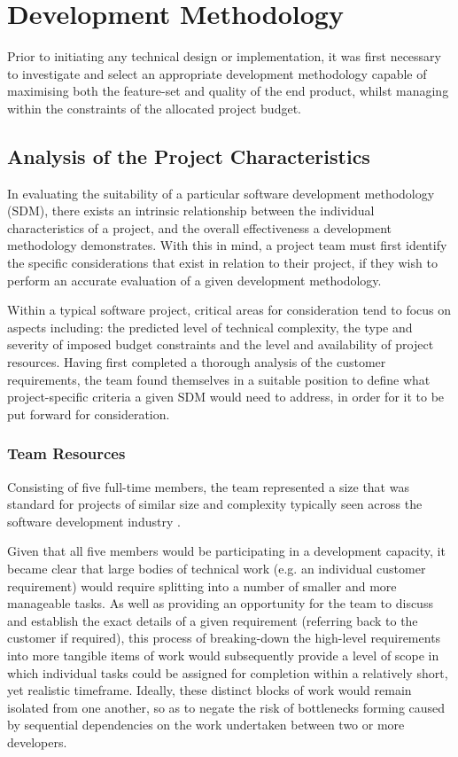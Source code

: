 \chapter{Development Methodology}

Prior to initiating any technical design or implementation, it was first necessary to investigate and select an appropriate development methodology capable of maximising both the feature-set and quality of the end product, whilst managing within the constraints of the allocated project budget.

\section{Analysis of the Project Characteristics}

In evaluating the suitability of a particular software development methodology (SDM), there exists an intrinsic relationship between the individual characteristics of a project, and the overall effectiveness a development methodology demonstrates. With this in mind, a project team must first identify the specific considerations that exist in relation to their project, if they wish to perform an accurate evaluation of a given development methodology.

Within a typical software project, critical areas for consideration tend to focus on aspects including: the predicted level of technical complexity, the type and severity of imposed budget constraints and the level and availability of project resources. Having first completed a thorough analysis of the customer requirements, the team found themselves in a suitable position to define what project-specific criteria a given SDM would need to address, in order for it to be put forward for consideration.

\subsection{Team Resources} 

Consisting of five full-time members, the team represented a size that was standard for projects of similar size and complexity typically seen across the software development industry \cite{scrum}. 

Given that all five members would be participating in a development capacity, it became clear that large bodies of technical work (e.g. an individual customer requirement) would require splitting into a number of smaller and more manageable tasks. As well as providing an opportunity for the team to discuss and establish the exact details of a given requirement (referring back to the customer if required), this process of breaking-down the high-level requirements into more tangible items of work would subsequently provide a level of scope in which individual tasks could be assigned for completion within a relatively short, yet realistic timeframe. Ideally, these distinct blocks of work would remain isolated from one another, so as to negate the risk of bottlenecks forming caused by sequential dependencies on the work undertaken between two or more developers.

